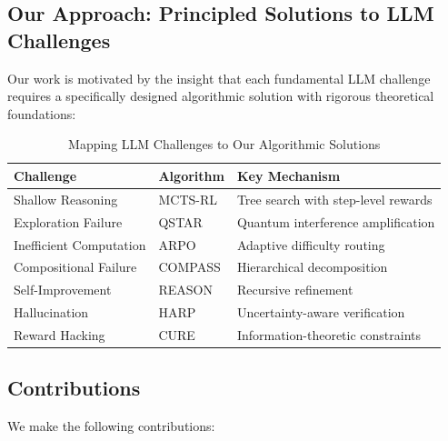 \documentclass[11pt,a4paper]{article}
\begin{document}
\subsection{Our Approach: Principled Solutions to LLM Challenges}

Our work is motivated by the insight that each fundamental LLM challenge requires a specifically designed algorithmic solution with rigorous theoretical foundations:

\begin{table}[h]
\centering
\caption{Mapping LLM Challenges to Our Algorithmic Solutions}
\begin{tabular}{lll}
\toprule
\textbf{Challenge} & \textbf{Algorithm} & \textbf{Key Mechanism} \\
\midrule
Shallow Reasoning & MCTS-RL & Tree search with step-level rewards \\
Exploration Failure & QSTAR & Quantum interference amplification \\
Inefficient Computation & ARPO & Adaptive difficulty routing \\
Compositional Failure & COMPASS & Hierarchical decomposition \\
Self-Improvement & REASON & Recursive refinement \\
Hallucination & HARP & Uncertainty-aware verification \\
Reward Hacking & CURE & Information-theoretic constraints \\
\bottomrule
\end{tabular}
\end{table}

\subsection{Contributions}

We make the following contributions:
\end{document}
